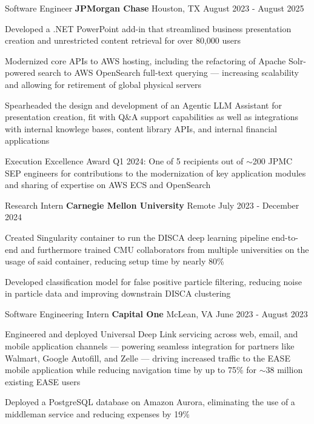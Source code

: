 
\begin{cventries}
  \cventry
    {Software Engineer}
    {\textbf{JPMorgan Chase}}
    {Houston, TX}
    {August 2023 - August 2025}
    {
      \begin{cvitems}
        \item{Developed a .NET PowerPoint add-in that streamlined business presentation creation and unrestricted content retrieval for over 80,000 users}
        \item{Modernized core APIs to AWS hosting, including the refactoring of Apache Solr-powered search to AWS OpenSearch full-text querying --- increasing scalability and allowing for retirement of global physical servers}
        \item{Spearheaded the design and development of an Agentic LLM Assistant for presentation creation, fit with Q\&A support capabilities as well as integrations with internal knowlege bases, content library APIs, and internal financial applications}
        \item{Execution Excellence Award Q1 2024: One of 5 recipients out of $\sim$200 JPMC SEP engineers for contributions to the modernization of key application modules and sharing of expertise on AWS ECS and OpenSearch}
      \end{cvitems}
    }

  \cventry
    {Research Intern}
    {\textbf{Carnegie Mellon University}}
    {Remote}
    {July 2023 - December 2024}
    {
      \begin{cvitems}
        \item{Created Singularity container to run the DISCA deep learning pipeline end-to-end and furthermore trained CMU collaborators from multiple universities on the usage of said container, reducing setup time by nearly 80\%}
        \item{Developed classification model for false positive particle filtering, reducing noise in particle data and improving downstrain DISCA clustering}
      \end{cvitems}
    }

  \cventry
    {Software Engineering Intern}
    {\textbf{Capital One}}
    {McLean, VA}
    {June 2023 - August 2023}
    {
      \begin{cvitems}
        \item{Engineered and deployed Universal Deep Link servicing across web, email, and mobile application channels --- powering seamless integration for partners like Walmart, Google Autofill, and Zelle --- driving increased traffic to the EASE mobile application while reducing navigation time by up to 75\% for $\sim$38 million existing EASE users}
        \item{Deployed a PostgreSQL database on Amazon Aurora, eliminating the use of a middleman service and reducing expenses by 19\%}
      \end{cvitems}
    }


\end{cventries}
